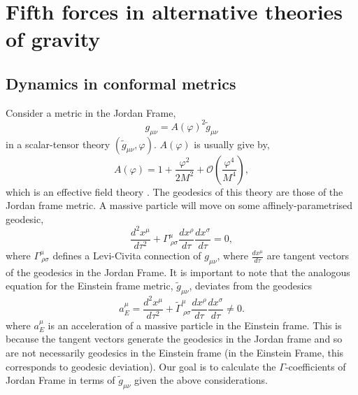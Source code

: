 
\chapter{Fifth forces in alternative theories of gravity}\label{appendixConformalDynamics}
\section{Dynamics in conformal metrics}
Consider a metric in the Jordan Frame,
\begin{equation}
g_{\mu\nu} = A(\varphi)^2\tilde{g} _{\mu\nu}
\end{equation}
in a scalar-tensor theory $(\tilde{g}_{\mu\nu},\varphi)$. $A(\varphi)$ is usually give by,
\begin{equation}
    A(\varphi) = 1 + \frac{\varphi^2}{2M^2} + \mathcal{O}\left(\frac{\varphi^4}{M^4}\right),
\end{equation}
which is an effective field theory \citep{darkdomains}. The geodesics of this theory are those of the Jordan frame metric. A massive particle will move on some affinely-parametrised geodesic, 
\begin{equation}
    \frac{d^2x^{\mu}}{d\tau^2} + \Gamma^{\mu}_{\ \rho\sigma}\frac{dx^{\rho}}{d\tau}\frac{dx^{\sigma}}{d\tau} = 0,
\end{equation}
where $\Gamma^{\mu}_{\ \rho\sigma}$ defines a Levi-Civita connection of $g_{\mu\nu}$, where $\frac{dx^{\mu}}{d\tau}$ are tangent vectors of the geodesics in the Jordan Frame. It is important to note that the analogous equation for the Einstein frame metric, $\tilde{g}_{\mu\nu}$, deviates from the geodesics
\begin{equation}
        a_E^{\mu} = \frac{d^2x^{\mu}}{d\tau^2} + \tilde{\Gamma}^{\mu}_{\ \rho\sigma}\frac{dx^{\rho}}{d\tau}\frac{dx^{\sigma}}{d\tau} \neq 0.
\end{equation}
where $a_E^{\mu}$ is an acceleration of a massive particle in the Einstein frame. This is because the tangent vectors generate the geodesics in the Jordan frame and so are not necessarily geodesics in the Einstein frame (in the Einstein Frame, this corresponds to geodesic deviation). Our goal is to calculate the $\Gamma$-coefficients of Jordan Frame in terms of $\tilde{g}_{\mu\nu}$ given the above considerations.
